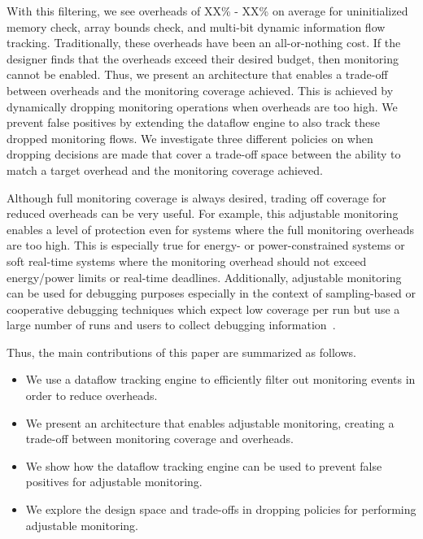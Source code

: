 With this filtering, we see overheads of XX\% - XX\% on average for
uninitialized memory check, array bounds check, and multi-bit dynamic
information flow tracking. 
Traditionally, these overheads have been an all-or-nothing cost. If the
designer finds that the overheads exceed their desired budget, then monitoring
cannot be enabled.  
Thus, we present an architecture that enables a trade-off between overheads and
the monitoring coverage achieved. This is achieved by dynamically dropping
monitoring operations when overheads are too high. We prevent false
positives by extending the dataflow engine to also track these dropped
monitoring flows. We investigate three different policies on when dropping decisions are
made that cover a trade-off space between the ability to match a target overhead
and the monitoring coverage achieved.

Although full monitoring coverage is always desired, trading off coverage for
reduced overheads can be very useful. For example, this adjustable
monitoring enables a level of protection even for systems where the full
monitoring overheads are too high. This is especially true for energy- or
power-constrained systems or soft real-time systems where the monitoring
overhead should not exceed energy/power limits or real-time deadlines.
Additionally, adjustable monitoring can be used for debugging purposes
especially in the context of sampling-based or cooperative debugging techniques
which expect low coverage per run but use a large number of runs and users to
collect debugging information~\cite{liblit-pldi05, chilimbi-asplos04,
greathouse-cgo11}. 

Thus, the main contributions of this paper are summarized as follows.
\begin{itemize}
  \item We use a dataflow tracking engine to efficiently filter out monitoring events in order to reduce overheads.
  \item We present an architecture that enables adjustable monitoring, creating a trade-off between monitoring coverage and overheads.
  \item We show how the dataflow tracking engine can be used to prevent false positives for adjustable monitoring.
  \item We explore the design space and trade-offs in dropping policies for performing adjustable monitoring.
\end{itemize}

